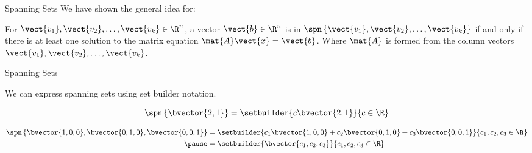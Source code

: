 \documentclass{beamer}
\begin{document}
\begin{frame}{Spanning Sets}
We have shown the general idea for:
\begin{theorem}
For $\vect{v_1},\vect{v_2},\dots,\vect{v_k}\in\R^n$, a vector $\vect{b}\in\R^n$ is in $\spn\left\{\vect{v_1},\vect{v_2},\dots,\vect{v_k}\right\}$ if and only if there is at least one solution to the matrix equation $\mat{A}\vect{x}=\vect{b}$. Where $\mat{A}$ is formed from the column vectors $\vect{v_1},\vect{v_2},\dots,\vect{v_k}$.
\end{theorem}
\end{frame}

\begin{frame}{Spanning Sets}
\begin{block}{}
We can express spanning sets using set builder notation.
\end{block}\pause

\begin{example}
\begin{equation*}
\spn\left\{\bvector{2,1}\right\}=\setbuilder{c\bvector{2,1}}{c\in\R}
\end{equation*}
\end{example}\pause

\begin{example}
\begin{equation*}
\begin{aligned}
\spn\left\{\bvector{1,0,0},\bvector{0,1,0},\bvector{0,0,1}\right\} &= 
\setbuilder{c_1\bvector{1,0,0}+c_2\bvector{0,1,0}+c_3\bvector{0,0,1}}{c_1,c_2,c_3\in\R}\\\pause
&=\setbuilder{\bvector{c_1,c_2,c_3}}{c_1,c_2,c_3\in\R}
\end{aligned}
\end{equation*}
\end{example}
\end{frame}
\end{document}
